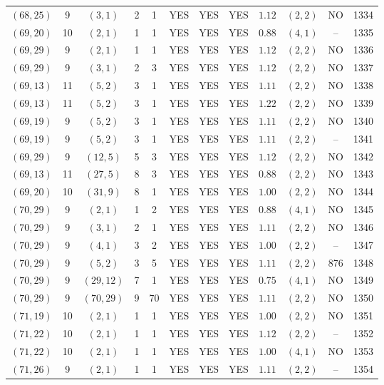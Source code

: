 \begin{longtable}{|c|c|c|c|c|c|c|c|c|c|c|c|}
$(68,25)$ & 9 & $(3,1)$ & 2 & 1 & YES & YES & YES & $1.12$ & $(2,2)$ & NO & 1334\\
$(69,20)$ & 10 & $(2,1)$ & 1 & 1 & YES & YES & YES & $0.88$ & $(4,1)$ & -- & 1335\\
$(69,29)$ & 9 & $(2,1)$ & 1 & 1 & YES & YES & YES & $1.12$ & $(2,2)$ & NO & 1336\\
$(69,29)$ & 9 & $(3,1)$ & 2 & 3 & YES & YES & YES & $1.12$ & $(2,2)$ & NO & 1337\\
$(69,13)$ & 11 & $(5,2)$ & 3 & 1 & YES & YES & YES & $1.11$ & $(2,2)$ & NO & 1338\\
$(69,13)$ & 11 & $(5,2)$ & 3 & 1 & YES & YES & YES & $1.22$ & $(2,2)$ & NO & 1339\\
$(69,19)$ & 9 & $(5,2)$ & 3 & 1 & YES & YES & YES & $1.11$ & $(2,2)$ & NO & 1340\\
$(69,19)$ & 9 & $(5,2)$ & 3 & 1 & YES & YES & YES & $1.11$ & $(2,2)$ & -- & 1341\\
$(69,29)$ & 9 & $(12,5)$ & 5 & 3 & YES & YES & YES & $1.12$ & $(2,2)$ & NO & 1342\\
$(69,13)$ & 11 & $(27,5)$ & 8 & 3 & YES & YES & YES & $0.88$ & $(2,2)$ & NO & 1343\\
$(69,20)$ & 10 & $(31,9)$ & 8 & 1 & YES & YES & YES & $1.00$ & $(2,2)$ & NO & 1344\\
$(70,29)$ & 9 & $(2,1)$ & 1 & 2 & YES & YES & YES & $0.88$ & $(4,1)$ & NO & 1345\\
$(70,29)$ & 9 & $(3,1)$ & 2 & 1 & YES & YES & YES & $1.11$ & $(2,2)$ & NO & 1346\\
$(70,29)$ & 9 & $(4,1)$ & 3 & 2 & YES & YES & YES & $1.00$ & $(2,2)$ & -- & 1347\\
$(70,29)$ & 9 & $(5,2)$ & 3 & 5 & YES & YES & YES & $1.11$ & $(2,2)$ & 876 & 1348\\
$(70,29)$ & 9 & $(29,12)$ & 7 & 1 & YES & YES & YES & $0.75$ & $(4,1)$ & NO & 1349\\
$(70,29)$ & 9 & $(70,29)$ & 9 & 70 & YES & YES & YES & $1.11$ & $(2,2)$ & NO & 1350\\
$(71,19)$ & 10 & $(2,1)$ & 1 & 1 & YES & YES & YES & $1.00$ & $(2,2)$ & NO & 1351\\
$(71,22)$ & 10 & $(2,1)$ & 1 & 1 & YES & YES & YES & $1.12$ & $(2,2)$ & -- & 1352\\
$(71,22)$ & 10 & $(2,1)$ & 1 & 1 & YES & YES & YES & $1.00$ & $(4,1)$ & NO & 1353\\
$(71,26)$ & 9 & $(2,1)$ & 1 & 1 & YES & YES & YES & $1.11$ & $(2,2)$ & -- & 1354\\

\end{longtable}

